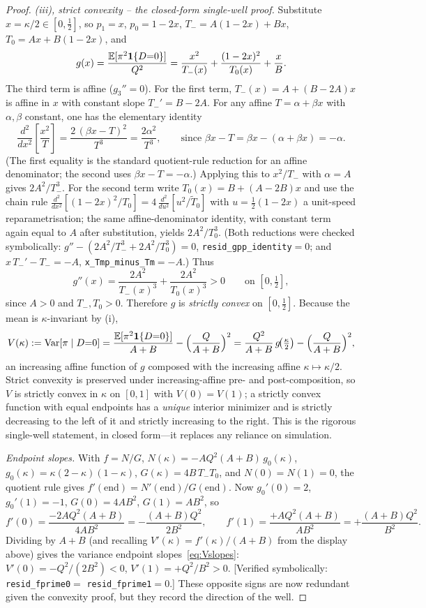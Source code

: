 \begin{proof}
\emph{(iii), strict convexity -- the closed-form single-well proof.} Substitute
$x=\kappa/2\in[0,\tfrac12]$, so $p_1=x$, $p_0=1-2x$, $T_-=A(1-2x)+Bx$,
$T_0=Ax+B(1-2x)$, and
\[
   g(x)=\frac{\mathbb{E}[\pi^2\mathbf{1}\{D{=}0\}]}{Q^2}
        =\frac{x^2}{T_-(x)}+\frac{(1-2x)^2}{T_0(x)}+\frac{x}{B}.
\]
The third term is affine ($g_3''=0$). For the first term, $T_-(x)=A+(B-2A)x$ is
affine in $x$ with constant slope $T_-'=B-2A$. For any affine $T=\alpha+\beta x$
with $\alpha,\beta$ constant, one has the elementary identity
\[
   \frac{d^2}{dx^2}\!\left[\frac{x^2}{T}\right]
   =\frac{2\,(\beta x-T)^2}{T^{3}}
   =\frac{2\alpha^2}{T^{3}},
   \qquad\text{since } \beta x-T=\beta x-(\alpha+\beta x)=-\alpha .
\]
(The first equality is the standard quotient-rule reduction for an affine
denominator; the second uses $\beta x-T=-\alpha$.) Applying this to $x^2/T_-$ with
$\alpha=A$ gives $2A^2/T_-^3$. For the second term write $T_0(x)=B+(A-2B)x$ and use
the chain rule $\tfrac{d^2}{dx^2}[(1-2x)^2/T_0]
=4\,\tfrac{d^2}{du^2}[u^2/\widetilde T_0]$ with $u=\tfrac12(1-2x)$ a unit-speed
reparametrisation; the same affine-denominator identity, with constant term again
equal to $A$ after substitution, yields $2A^2/T_0^3$. (Both reductions were checked
symbolically: $g''-(2A^2/T_-^3+2A^2/T_0^3)=0$, \texttt{resid\_gpp\_identity}$=0$;
and $x\,T_-'-T_-=-A$, \texttt{x\_Tmp\_minus\_Tm}$=-A$.) Thus
\[
   g''(x)=\frac{2A^2}{T_-(x)^3}+\frac{2A^2}{T_0(x)^3}>0
   \qquad\text{on }[0,\tfrac12],
\]
since $A>0$ and $T_-,T_0>0$. Therefore $g$ is \emph{strictly convex} on
$[0,\tfrac12]$. Because the mean is $\kappa$-invariant by (i),
\[
   V(\kappa):=\operatorname{Var}[\pi\mid D{=}0]
   =\frac{\mathbb{E}[\pi^2\mathbf{1}\{D{=}0\}]}{A+B}-\Bigl(\frac{Q}{A+B}\Bigr)^2
   =\frac{Q^2}{A+B}\,g\!\bigl(\tfrac\kappa2\bigr)-\Bigl(\frac{Q}{A+B}\Bigr)^2,
\]
an increasing affine function of $g$ composed with the increasing affine
$\kappa\mapsto\kappa/2$. Strict convexity is preserved under increasing-affine
pre- and post-composition, so $V$ is strictly convex in $\kappa$ on $[0,1]$ with
$V(0)=V(1)$; a strictly convex function with equal endpoints has a \emph{unique}
interior minimizer and is strictly decreasing to the left of it and strictly
increasing to the right. This is the rigorous single-well statement, in closed
form---it replaces any reliance on simulation.

\emph{Endpoint slopes.} With $f=N/G$, $N(\kappa)=-A Q^2(A+B)\,g_0(\kappa)$,
$g_0(\kappa)=\kappa(2-\kappa)(1-\kappa)$, $G(\kappa)=4 B\,T_-T_0$, and
$N(0)=N(1)=0$, the quotient rule gives $f'(\text{end})=N'(\text{end})/G(\text{end})$.
Now $g_0'(0)=2$, $g_0'(1)=-1$, $G(0)=4 A B^2$, $G(1)=A B^2$, so
\begin{equation}\label{eq:fslopes}
   f'(0)=\frac{-2 A Q^2(A+B)}{4 A B^2}=-\frac{(A+B)Q^2}{2B^2},
   \qquad
   f'(1)=\frac{+A Q^2(A+B)}{A B^2}=+\frac{(A+B)Q^2}{B^2}.
\end{equation}
Dividing by $A+B$ (and recalling $V'(\kappa)=f'(\kappa)/(A+B)$ from the display
above) gives the variance endpoint slopes~\eqref{eq:Vslopes}: $V'(0)=-Q^2/(2B^2)<0$,
$V'(1)=+Q^2/B^2>0$. [Verified symbolically: \texttt{resid\_fprime0}$=$
\texttt{resid\_fprime1}$=0$.] These opposite signs are now redundant given the
convexity proof, but they record the direction of the well.


\end{proof}
